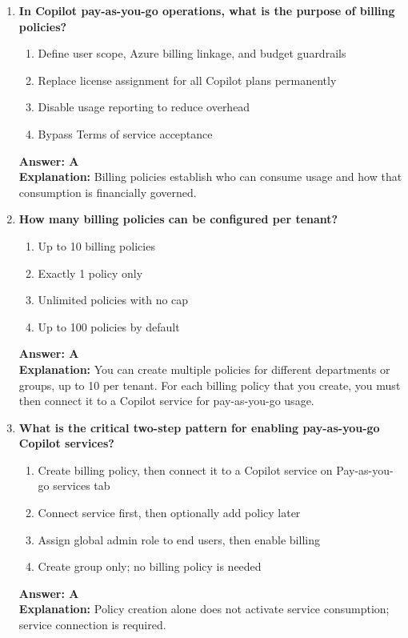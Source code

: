 \documentclass[10pt]{article}
\begin{document}
\begin{enumerate}[leftmargin=*]
\item \textbf{In Copilot pay-as-you-go operations, what is the purpose of billing policies?}
\begin{enumerate}[label=\Alph*.]
  \item Define user scope, Azure billing linkage, and budget guardrails
  \item Replace license assignment for all Copilot plans permanently
  \item Disable usage reporting to reduce overhead
  \item Bypass Terms of service acceptance
\end{enumerate}
\textbf{Answer: A}\\
\textbf{Explanation:} Billing policies establish who can consume usage and how that consumption is financially governed.

\item \textbf{How many billing policies can be configured per tenant?}
\begin{enumerate}[label=\Alph*.]
  \item Up to 10 billing policies
  \item Exactly 1 policy only
  \item Unlimited policies with no cap
  \item Up to 100 policies by default
\end{enumerate}
\textbf{Answer: A}\\
\textbf{Explanation:} You can create multiple policies for different departments or groups, up to 10 per tenant. For each billing policy that you create, you must then connect it to a Copilot service for pay-as-you-go usage.

\item \textbf{What is the critical two-step pattern for enabling pay-as-you-go Copilot services?}
\begin{enumerate}[label=\Alph*.]
  \item Create billing policy, then connect it to a Copilot service on Pay-as-you-go services tab
  \item Connect service first, then optionally add policy later
  \item Assign global admin role to end users, then enable billing
  \item Create group only; no billing policy is needed
\end{enumerate}
\textbf{Answer: A}\\
\textbf{Explanation:} Policy creation alone does not activate service consumption; service connection is required.


\end{enumerate}
\end{document}

